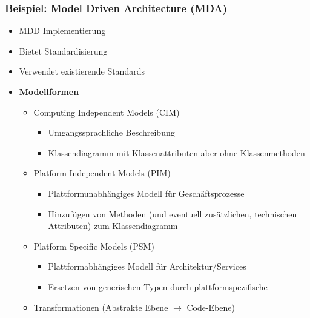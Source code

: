 \subsubsection{Beispiel: Model Driven Architecture (MDA)}
\begin{itemize}
	\item MDD Implementierung
	\item Bietet Standardisierung
	\item Verwendet existierende Standards
	\item \textbf{Modellformen}
	\begin{itemize}
		\item Computing Independent Models (CIM)
		\begin{itemize}
			\item Umgangssprachliche Beschreibung
			\item Klassendiagramm mit Klassenattributen aber ohne Klassenmethoden
		\end{itemize}
		\item Platform Independent Models (PIM)
		\begin{itemize}
			\item Plattformunabhängiges Modell für Geschäftsprozesse
			\item Hinzufügen von Methoden (und eventuell zusätzlichen, technischen Attributen) zum Klassendiagramm
		\end{itemize}
		\item Platform Specific Models (PSM)
		\begin{itemize}
			\item Plattformabhängiges Modell für Architektur/Services
			\item Ersetzen von generischen Typen durch plattformspezifische
		\end{itemize}
		\item Transformationen (Abstrakte Ebene \(\rightarrow\) Code-Ebene)\\\\
	\end{itemize}
\end{itemize}


